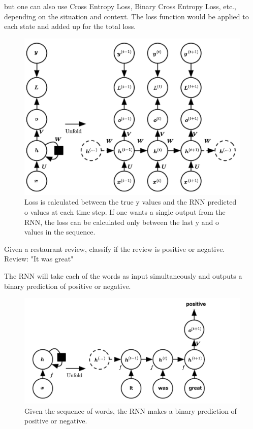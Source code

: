 but one can also use Cross Entropy Loss, Binary Cross Entropy Loss, etc., depending on the situation and context. The loss function would be applied to each state and added up for the total loss.



\begin{figure}[H]
    \centering
    \includegraphics[scale=0.25]{images/Chapter12/RNN_with_loss.png}
    \caption{Loss is calculated between the true y values and the RNN predicted o values at each time step. If one wants a single output from the RNN, the loss can be calculated only between the last y and o values in the sequence.} 
    \label{fig:12.2}
\end{figure}

\begin{example}
    Given a restaurant review, classify if the review is positive or negative.\\
    Review: "It was great"
\end{example}

The RNN will take each of the words as input simultaneously and outputs a binary prediction of positive or negative. 





\begin{figure}[H]
    \centering
    \includegraphics[scale=0.25]{images/Chapter12/sentiment_analysis.png}
    \caption{Given the sequence of words, the RNN makes a binary prediction of positive or negative.}
    \label{fig:12.2}
\end{figure}


